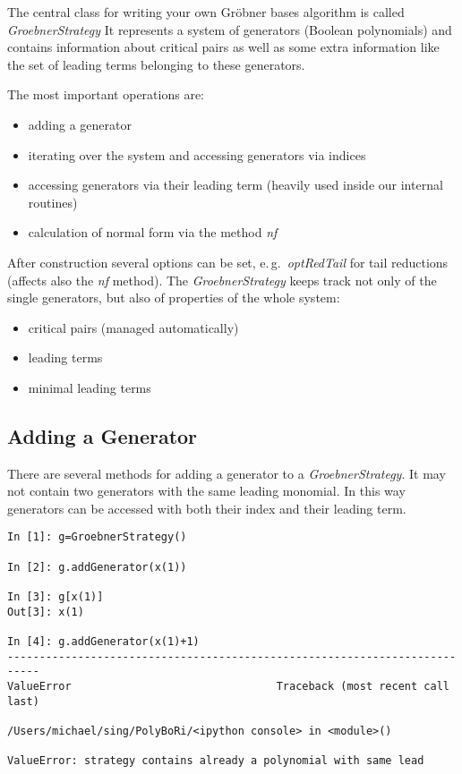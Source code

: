 \documentclass[]{article}
\newcommand{\Groebner}{Gr\"{o}bner\xspace}
\newcommand{\functionname}[1]{\textit{#1}\xspace}
\newcounter{thm}
\begin{document}
The central class for writing your own \Groebner bases algorithm is called \functionname{GroebnerStrategy}
%
It represents a system of generators (Boolean polynomials) and contains information about critical pairs as well as some extra information like
the set of leading terms belonging to these generators.

The most important operations are:
\begin{itemize}
    \item adding a generator
    \item iterating over the system and accessing generators via indices
    \item accessing generators via their leading term (heavily used inside our internal routines)
    \item calculation of normal form via the method \functionname{nf} 
\end{itemize}

After construction several options can be set, e.\,g.\ \functionname{optRedTail} for tail reductions (affects also the \functionname{nf} method).
%
The \functionname{GroebnerStrategy} keeps track not only of the single generators, but also of properties of the whole system:
\begin{itemize}
    \item critical pairs (managed automatically)
    \item leading terms
    \item minimal leading terms
\end{itemize}
\subsection{Adding a Generator}
There are several methods for adding a generator to a \functionname{GroebnerStrategy}.
It may not contain two generators with the same leading monomial.
In this way generators can be accessed with both their index and their leading term.

\begin{lstlisting}
In [1]: g=GroebnerStrategy()

In [2]: g.addGenerator(x(1))

In [3]: g[x(1)]
Out[3]: x(1)

In [4]: g.addGenerator(x(1)+1)
---------------------------------------------------------------------------
ValueError                                Traceback (most recent call last)

/Users/michael/sing/PolyBoRi/<ipython console> in <module>()

ValueError: strategy contains already a polynomial with same lead
\end{lstlisting}
\end{document}
